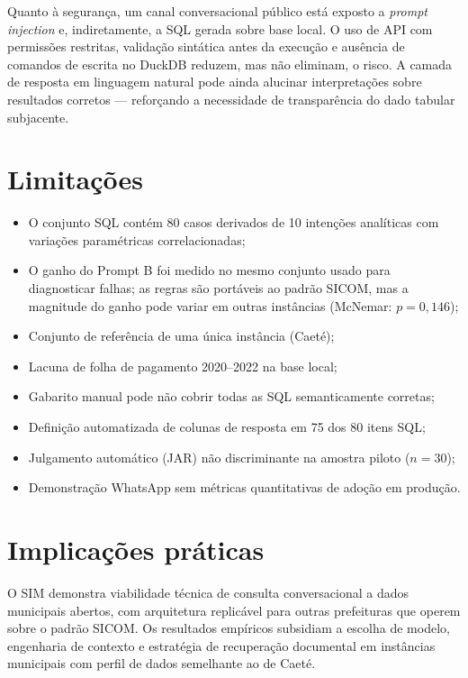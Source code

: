 Quanto à segurança, um canal conversacional público está exposto a \textit{prompt injection} e, indiretamente, a SQL gerada sobre base local. O uso de API com permissões restritas, validação sintática antes da execução e ausência de comandos de escrita no DuckDB reduzem, mas não eliminam, o risco. A camada de resposta em linguagem natural pode ainda alucinar interpretações sobre resultados corretos --- reforçando a necessidade de transparência do dado tabular subjacente.

\section{Limitações}
\label{sec:limitacoes}

\begin{itemize}
    \item O conjunto SQL contém 80 casos derivados de 10 intenções analíticas com variações paramétricas correlacionadas;
    \item O ganho do Prompt B foi medido no mesmo conjunto usado para diagnosticar falhas; as regras são portáveis ao padrão SICOM, mas a magnitude do ganho pode variar em outras instâncias (McNemar: $p = 0{,}146$);
    \item Conjunto de referência de uma única instância (Caeté);
    \item Lacuna de folha de pagamento 2020--2022 na base local;
    \item Gabarito manual pode não cobrir todas as SQL semanticamente corretas;
    \item Definição automatizada de colunas de resposta em 75 dos 80 itens SQL;
    \item Julgamento automático (JAR) não discriminante na amostra piloto ($n=30$);
    \item Demonstração WhatsApp sem métricas quantitativas de adoção em produção.
\end{itemize}

\section{Implicações práticas}

O SIM demonstra viabilidade técnica de consulta conversacional a dados municipais abertos, com arquitetura replicável para outras prefeituras que operem sobre o padrão SICOM. Os resultados empíricos subsidiam a escolha de modelo, engenharia de contexto e estratégia de recuperação documental em instâncias municipais com perfil de dados semelhante ao de Caeté.
